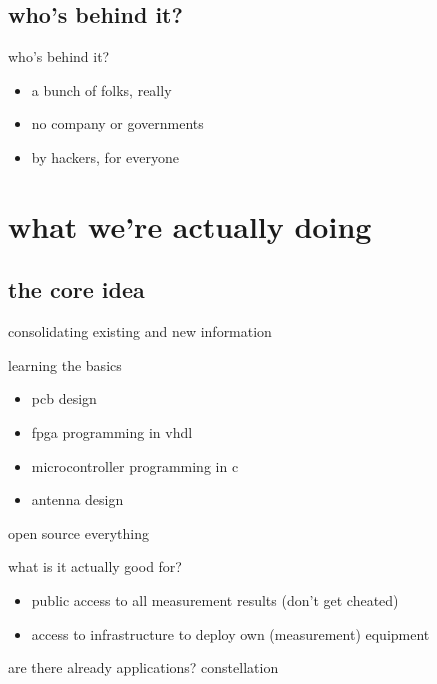 \subsection{who's behind it?}
	\begin{frame}{who's behind it?}
		\begin{itemize}
			\item a bunch of folks, really
			\item no company or governments
			\item by hackers, for everyone
		\end{itemize}
	\end{frame}


\section{what we're actually doing}

\subsection{the core idea}
	\begin{frame}{consolidating existing and new information}
	\end{frame}
	\begin{frame}{learning the basics}
		\begin{itemize}
			\item pcb design
			\item fpga programming in vhdl
			\item microcontroller programming in c
			\item antenna design
		\end{itemize}
	\end{frame}
	\begin{frame}{open source everything}
	\end{frame}
	\begin{frame}{what is it actually good for?}
		\begin{itemize}
			\item public access to all measurement results (don't get cheated)
			\item access to infrastructure to deploy own (measurement) equipment
		\end{itemize}
	\end{frame}
	\begin{frame}{are there already applications?}
		constellation
	\end{frame}

